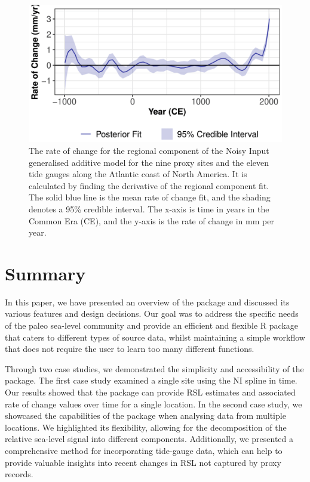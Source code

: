 \begin{figure}

{\centering \includegraphics[width=0.8\linewidth]{figures/regrateplot-1} 

}

\caption{The rate of change for the regional component of the Noisy Input generalised additive model for the nine proxy sites and the eleven tide gauges along the Atlantic coast of North America. It is calculated by finding the derivative of the regional component fit. The solid blue line is the mean rate of change fit, and the shading denotes a 95\% credible interval. The x-axis is time in years in the Common Era (CE), and the y-axis is the rate of change in mm per year.}\label{fig:regrateplotload}
\end{figure}

\normalsize

\section{Summary}\label{summmary}

In this paper, we have presented an overview of the  package and discussed its various features and design decisions. Our goal was to address the specific needs of the paleo sea-level community and provide an efficient and flexible R package that caters to different types of source data, whilst maintaining a simple workflow that does not require the user to learn too many different functions.

Through two case studies, we demonstrated the simplicity and accessibility of the package. The first case study examined a single site using the NI spline in time. Our results showed that the  package can provide RSL estimates and associated rate of change values over time for a single location. In the second case study, we showcased the capabilities of the  package when analysing data from multiple locations. We highlighted its flexibility, allowing for the decomposition of the relative sea-level signal into different components. Additionally, we presented a comprehensive method for incorporating tide-gauge data, which can help to provide valuable insights into recent changes in RSL not captured by proxy records.

